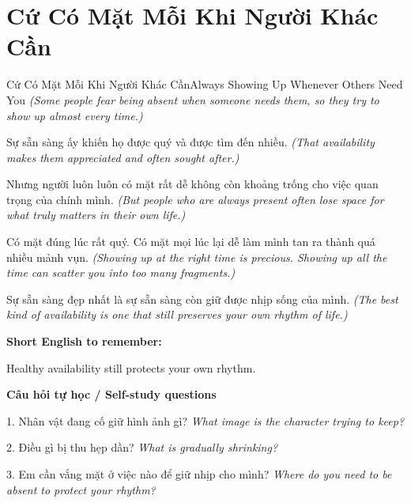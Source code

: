 \section{Cứ Có Mặt Mỗi Khi Người Khác Cần}
\begin{truyen}{Cứ Có Mặt Mỗi Khi Người Khác Cần}{Always Showing Up Whenever Others Need You}
\textit{(Some people fear being absent when someone needs them, so they try to show up almost every time.)}

Sự sẵn sàng ấy khiến họ được quý và được tìm đến nhiều.
\textit{(That availability makes them appreciated and often sought after.)}

Nhưng người luôn luôn có mặt rất dễ không còn khoảng trống cho việc quan trọng của chính mình.
\textit{(But people who are always present often lose space for what truly matters in their own life.)}

Có mặt đúng lúc rất quý. Có mặt mọi lúc lại dễ làm mình tan ra thành quá nhiều mảnh vụn.
\textit{(Showing up at the right time is precious. Showing up all the time can scatter you into too many fragments.)}

\end{truyen}

\begin{baihoc}
Sự sẵn sàng đẹp nhất là sự sẵn sàng còn giữ được nhịp sống của mình.
\textit{(The best kind of availability is one that still preserves your own rhythm of life.)}
\end{baihoc}

\begin{ghinhoanh}
\textbf{Short English to remember:}

Healthy availability still protects your own rhythm.

\end{ghinhoanh}

\begin{tuhocnhanh}
\textbf{Câu hỏi tự học / Self-study questions}

1. Nhân vật đang cố giữ hình ảnh gì? \textit{What image is the character trying to keep?}

2. Điều gì bị thu hẹp dần? \textit{What is gradually shrinking?}

3. Em cần vắng mặt ở việc nào để giữ nhịp cho mình? \textit{Where do you need to be absent to protect your rhythm?}
\end{tuhocnhanh}
\ngancach

